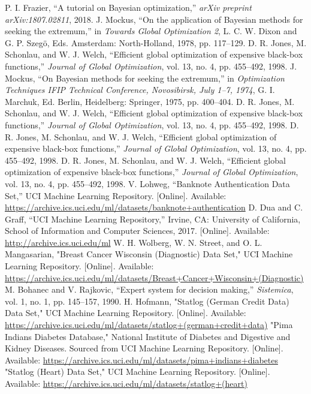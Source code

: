\documentclass[conference]{IEEEtran}
\begin{document}
\begin{thebibliography}{99}
 P. I. Frazier, “A tutorial on Bayesian optimization,” \textit{arXiv preprint arXiv:1807.02811}, 2018.
 J. Mockus, “On the application of Bayesian methods for seeking the extremum,” in \textit{Towards Global Optimization 2}, L. C. W. Dixon and G. P. Szegö, Eds. Amsterdam: North-Holland, 1978, pp. 117–129.
 D. R. Jones, M. Schonlau, and W. J. Welch, “Efficient global optimization of expensive black-box functions,” \textit{Journal of Global Optimization}, vol. 13, no. 4, pp. 455–492, 1998.
 J. Mockus, “On Bayesian methods for seeking the extremum,” in \textit{Optimization Techniques IFIP Technical Conference, Novosibirsk, July 1–7, 1974}, G. I. Marchuk, Ed. Berlin, Heidelberg: Springer, 1975, pp. 400–404.
 D. R. Jones, M. Schonlau, and W. J. Welch, “Efficient global optimization of expensive black-box functions,” \textit{Journal of Global Optimization}, vol. 13, no. 4, pp. 455–492, 1998.
 D. R. Jones, M. Schonlau, and W. J. Welch, “Efficient global optimization of expensive black-box functions,” \textit{Journal of Global Optimization}, vol. 13, no. 4, pp. 455–492, 1998.
 D. R. Jones, M. Schonlau, and W. J. Welch, “Efficient global optimization of expensive black-box functions,” \textit{Journal of Global Optimization}, vol. 13, no. 4, pp. 455–492, 1998.
 V. Lohweg, “Banknote Authentication Data Set,” UCI Machine Learning Repository. [Online]. Available: \url{https://archive.ics.uci.edu/ml/datasets/banknote+authentication}
 D. Dua and C. Graff, “UCI Machine Learning Repository,” Irvine, CA: University of California, School of Information and Computer Sciences, 2017. [Online]. Available: \url{http://archive.ics.uci.edu/ml}
 W. H. Wolberg, W. N. Street, and O. L. Mangasarian, "Breast Cancer Wisconsin (Diagnostic) Data Set," UCI Machine Learning Repository. [Online]. Available: \url{https://archive.ics.uci.edu/ml/datasets/Breast+Cancer+Wisconsin+(Diagnostic)}
 M. Bohanec and V. Rajkovic, “Expert system for decision making,” \textit{Sistemica}, vol. 1, no. 1, pp. 145–157, 1990.
 H. Hofmann, "Statlog (German Credit Data) Data Set," UCI Machine Learning Repository. [Online]. Available: \url{https://archive.ics.uci.edu/ml/datasets/statlog+(german+credit+data)}
 "Pima Indians Diabetes Database," National Institute of Diabetes and Digestive and Kidney Diseases. Sourced from UCI Machine Learning Repository. [Online]. Available: \url{https://archive.ics.uci.edu/ml/datasets/pima+indians+diabetes}
 "Statlog (Heart) Data Set," UCI Machine Learning Repository. [Online]. Available: \url{https://archive.ics.uci.edu/ml/datasets/statlog+(heart)}

\end{thebibliography}
\end{document}
